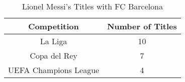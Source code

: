 \begin{table}[h!]
    \centering
    \caption{Lionel Messi's Titles with FC Barcelona}
    \begin{tabular}{|c|c|}
    \hline
    \textbf{Competition} & \textbf{Number of Titles} \\ \hline
    La Liga & 10 \\ \hline
    Copa del Rey & 7 \\ \hline
    UEFA Champions League & 4  \\ \hline
    \end{tabular}
    \label{tab:messi_barca_titles} 
\end{table}
    
